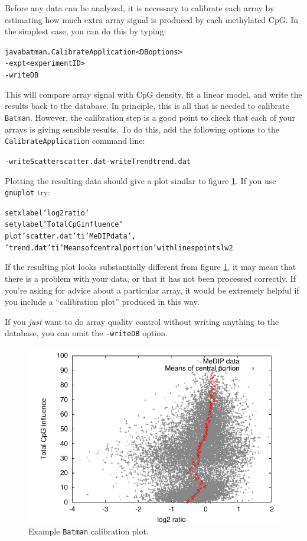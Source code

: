 \documentclass[a4paper, 11pt]{article}
\newcommand{\bm}{{\tt Batman}\xspace}
\begin{document}
Before any data can be analyzed, it is necessary to calibrate each array by
estimating how much extra array signal is produced by each methylated CpG.  In
the simplest case, you can do this by typing:

\begin{alltt}java batman.CalibrateApplication <DB options>
        -expt <experiment ID>
        -writeDB\end{alltt}

This will compare array signal with CpG density, fit a linear model, and write
the results back to the database.  In principle, this is all that is needed
to calibrate \bm.  However, the calibration step is a good point to check that
each of your arrays is giving sensible results.  To do this, add the following
options to the {\tt CalibrateApplication} command line:

\begin{alltt}-writeScatter scatter.dat -writeTrend trend.dat\end{alltt}

Plotting the resulting data should give a plot similar to figure \ref{example.calibrate}.  If you
use {\tt gnuplot} try:

\begin{alltt}set xlabel 'log2 ratio'
set ylabel 'Total CpG influence'
plot 'scatter.dat' ti 'MeDIP data', 
     'trend.dat' ti 'Means of central portion' with linespoints lw 2\end{alltt}

If the resulting plot looks substantially different from figure \ref{example.calibrate}, it may mean
that there is a problem with your data, or that it has not been processed
correctly.  If you're asking for advice about a particular array, it would be
extremely helpful if you include a ``calibration plot'' produced in this way.

If you {\it just} want to do array quality control without writing anything
to the database, you can omit the {\tt -writeDB} option.

\begin{figure}[!bth]
\begin{center}
\includegraphics[scale=0.66]{calibrate.pdf}
\caption{Example \bm calibration plot.}
\label{example.calibrate}
\end{center}
\end{figure}
\end{document}
